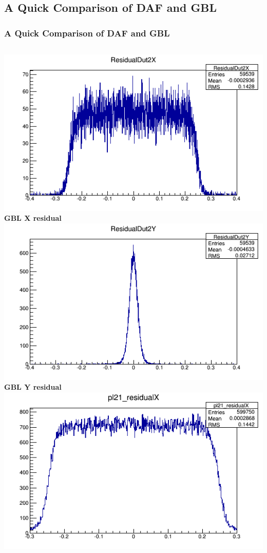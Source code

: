 \documentclass{beamer}
\begin{document}
\subsection{A Quick Comparison of DAF and GBL}
\begin{frame}
\frametitle{A Quick Comparison of DAF and GBL}
\begin{columns}[t]
\centering
\includegraphics[width=0.8\linewidth]{pics/DataDESYNov13_GBL_DUT21_ResidualX.png}\\
\tiny{\textbf{GBL X residual}}\\
\includegraphics[width=0.8\linewidth]{pics/DataDESYNov13_GBL_DUT21_ResidualY.png}\\
\tiny{\textbf{GBL Y residual}}\\
\centering
\includegraphics[width=0.8\linewidth]{pics/DESYNOV13_DUT21_ResidualX.png}\\ 

\end{columns}
\end{frame}
\end{document}
